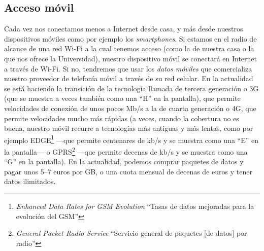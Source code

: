 \subsection{Acceso móvil} Cada vez nos conectamos menos a Internet desde casa, y más desde nuestros dispositivos móviles como por ejemplo los \emph{smartphones}. Si estamos en el radio de alcance de una red Wi-Fi a la cual tenemos acceso (como la de nuestra casa o la que nos ofrece la Universidad), nuestro dispositivo móvil se conectará en Internet a través de Wi-Fi. Si no, tendremos que usar los \emph{datos móviles} que comercializa nuestro proveedor de telefonía móvil a través de su red celular. En la actualidad se está haciendo la transición de la tecnología llamada de tercera generación o 3G (que se muestra a veces también como una ``H'' en la pantalla), que permite velocidades de conexión de unos pocos Mb/s a la de cuarta generación o 4G, que permite velocidades mucho más rápidas (a veces, cuando la cobertura no es buena, nuestro móvil recurre a tecnologías más antiguas y más lentas, como por ejemplo EDGE\footnote{\emph{Enhanced Data Rates for GSM Evolution} ``Tasas de datos mejoradas para la evolución del GSM''} ---que permite centenares de kb/s y se muestra como una ``E'' en la pantalla--- o GPRS\footnote{\emph{General Packet Radio Service} ``Servicio general de paquetes [de datos] por radio''} ---que permite decenas de kb/s y se muestra como una ``G'' en la pantalla). En la actualidad, podemos comprar paquetes de datos y pagar unos 5--7 euros por GB, o una cuota mensual de decenas de euros y tener datos ilimitados. 

